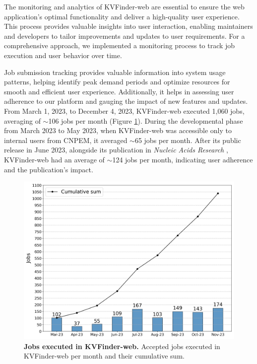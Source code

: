 \documentclass[Ingles]{phdthesis}
\begin{document}
The monitoring and analytics of KVFinder-web are essential to ensure the web application's optimal functionality and deliver a high-quality user experience. This process provides valuable insights into user interaction, enabling maintainers and developers to tailor improvements and updates to user requirements. For a comprehensive approach, we implemented a monitoring process to track job execution and user behavior over time. 

Job submission tracking provides valuable information into system usage patterns, helping identify peak demand periods and optimize resources for smooth and efficient user experience. Additionally, it helps in assessing user adherence to our platform and gauging the impact of new features and updates. From March 1, 2023, to December 4, 2023, KVFinder-web executed 1,060 jobs, averaging of $\sim$106 jobs per month (Figure \ref{fig:job-execution}). During the developmental phase from March 2023 to May 2023, when KVFinder-web was accessible only to internal users from CNPEM, it averaged $\sim$65 jobs per month. After its public release in June 2023, alongside its publication in \textit{Nucleic Acids Research} \cite{guerra2023A}, KVFinder-web had an average of $\sim$124 jobs per month, indicating user adherence and the publication's impact.

\begin{figure}[h]
  \centering
  \includegraphics[scale=0.5]{images/jobs-executed-per-month.png}
  \caption[Jobs executed in KVFinder-web]{\textbf{Jobs executed in KVFinder-web.} Accepted jobs executed in KVFinder-web per month and their cumulative sum.}
  \label{fig:job-execution}
\end{figure}
\end{document}
